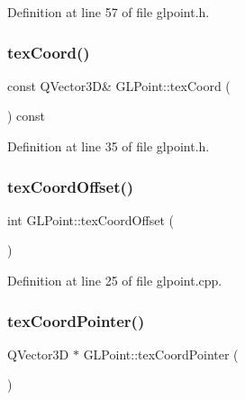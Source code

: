 Definition at line 57 of file glpoint.\+h.

\mbox{\label{class_g_l_point_ac496dbef3a6ee7adc444b4e0c5d99ba0}} 
\subsubsection{\texorpdfstring{texCoord()}{texCoord()}}
{\footnotesize\ttfamily const Q\+Vector3D\& G\+L\+Point\+::tex\+Coord (\begin{DoxyParamCaption}{ }\end{DoxyParamCaption}) const\hspace{0.3cm}{\ttfamily [inline]}}



Definition at line 35 of file glpoint.\+h.

\mbox{\label{class_g_l_point_ac94d3bf766f3f81da117997950844b21}} 
\subsubsection{\texorpdfstring{texCoordOffset()}{texCoordOffset()}}
{\footnotesize\ttfamily int G\+L\+Point\+::tex\+Coord\+Offset (\begin{DoxyParamCaption}{ }\end{DoxyParamCaption})\hspace{0.3cm}{\ttfamily [static]}}



Definition at line 25 of file glpoint.\+cpp.

\mbox{\label{class_g_l_point_ad4cffce86ff32bfbdbbbe6b884f354c6}} 
\subsubsection{\texorpdfstring{texCoordPointer()}{texCoordPointer()}}
{\footnotesize\ttfamily Q\+Vector3D $\ast$ G\+L\+Point\+::tex\+Coord\+Pointer (\begin{DoxyParamCaption}{ }\end{DoxyParamCaption})\hspace{0.3cm}{\ttfamily [inline]}}



